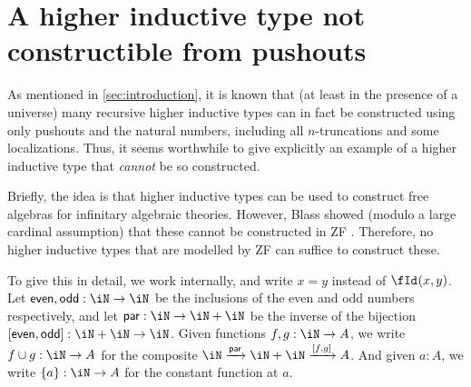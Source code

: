 \documentclass{amsart}
\let\N\iN
\begin{document}
\section{A higher inductive type not constructible from pushouts}
\label{sec:blass}

As mentioned in \cref{sec:introduction}, it is known that (at least in the presence of a universe) many recursive higher inductive types can in fact be constructed using only pushouts and the natural numbers, including all $n$-truncations and some localizations.
Thus, it seems worthwhile to give explicitly an example of a higher inductive type that \emph{cannot} be so constructed.

Briefly, the idea is that higher inductive types can be used to construct free algebras for infinitary algebraic theories.
However, Blass showed (modulo a large cardinal assumption) that these cannot be constructed in ZF \cite{blass:freealg}.
Therefore, no higher inductive types that are modelled by ZF can suffice to construct these.

To give this in detail, we work internally, and write $x=y$ instead of $\id x y$.
Let $\mathsf{even},\mathsf{odd}:\N\to\N$ be the inclusions of the even and odd numbers respectively, and let $\mathsf{par}:\N\to\N+\N$ be the inverse of the bijection $[\mathsf{even},\mathsf{odd}]:\N+\N\to\N$.
Given functions $f,g:\N\to A$, we write $f\cup g:\N\to A$ for the composite $\N \xto{\mathsf{par}} \N+\N \xto{[f,g]}A$.
And given $a:A$, we write $\{a\}:\N\to A$ for the constant function at $a$.
\end{document}
